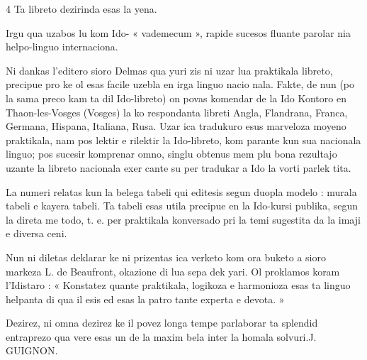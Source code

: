 \begin{VUpage}[6]{4}
Ta libreto dezirinda esas la yena.

\VUblancAlinea
Irgu qua uzabos lu kom Ido- « vademecum »,\nl
rapide sucesos fluante parolar nia helpo-linguo\nl
internaciona.

\VUblancAlinea
Ni dankas l'editero sioro Delmas qua yuri\cc
zis ni uzar lua praktikala libreto, precipue pro\nl
ke ol esas facile uzebla en irga linguo nacio\cc
nala. Fakte, de nun (po la sama preco kam ta\nl
dil Ido-libreto) on povas komendar de la Ido\cc
Kontoro en Thaon-les-Vosges (Vosges) la ko\cc
respondanta libreti Angla, Flandrana, Franca,\nl
Germana, Hispana, Italiana, Rusa. Uzar ica\nl
tradukuro esus marveloza moyeno praktikala,\nl
nam pos lektir e rilektir la Ido-libreto, kom\cc
parante kun sua nacionala linguo; pos sucesir\nl
komprenar omno, singlu obtenus mem plu\nl
bona rezultajo uzante la libreto nacionala exer\cc
cante su per tradukar a Ido la vorti parlek\cc
tita.

\VUblancAlinea
La numeri relatas kun la belega tabeli qui\nl
editesis segun duopla modelo : murala tabeli\nl
e kayera tabeli. Ta tabeli esas utila precipue\nl
en la Ido-kursi publika, segun la direta me\cc
todo, t. e. per praktikala konversado pri la\nl
temi sugestita da la imaji e diversa ceni.

\VUblancAlinea
Nun ni diletas deklarar ke ni prizentas ica\nl
verketo kom ora buketo a sioro markeza L. de\nl
Beaufront, okazione di lua sepa dek yari. Ol\nl
proklamos koram l'Idistaro : « Konstatez\nl
quante praktikala, logikoza e harmonioza esas\nl
ta linguo helpanta di qua il esis ed esas la patro\nl
tante experta e devota. »

\VUblancAlinea
Dezirez, ni omna dezirez ke il povez longa\cc
tempe parlaborar ta splendid entraprezo qua\nl
vere esas un de la maxim bela inter la homala\nl
solvuri.\hfill J. GUIGNON.
\end{VUpage}
